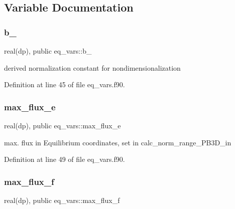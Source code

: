 \subsection{Variable Documentation}
\mbox{\label{namespaceeq__vars_acdd2464f2282359a818e4159b502e84b}} 
\subsubsection{\texorpdfstring{b\+\_}{b\_0}}
{\footnotesize\ttfamily real(dp), public eq\+\_\+vars\+::b\+\_}



derived normalization constant for nondimensionalization 



Definition at line 45 of file eq\+\_\+vars.\+f90.

\mbox{\label{namespaceeq__vars_a863feef76ae60309d2e3ed4eed6bd436}} 
\subsubsection{\texorpdfstring{max\+\_\+flux\+\_\+e}{max\_flux\_e}}
{\footnotesize\ttfamily real(dp), public eq\+\_\+vars\+::max\+\_\+flux\+\_\+e}



max. flux in Equilibrium coordinates, set in calc\+\_\+norm\+\_\+range\+\_\+\+P\+B3\+D\+\_\+in 



Definition at line 49 of file eq\+\_\+vars.\+f90.

\mbox{\label{namespaceeq__vars_a46c97bf2a6d6eca952ca5173fcf9cdcb}} 
\subsubsection{\texorpdfstring{max\+\_\+flux\+\_\+f}{max\_flux\_f}}
{\footnotesize\ttfamily real(dp), public eq\+\_\+vars\+::max\+\_\+flux\+\_\+f}



